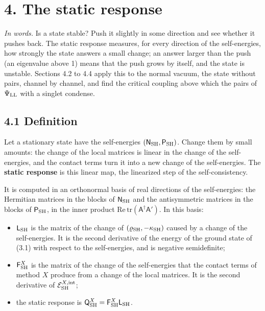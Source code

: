 \documentclass[
  10pt,
]{article}
\providecommand{\tightlist}{%
  \setlength{\itemsep}{0pt}\setlength{\parskip}{0pt}}
\begin{document}
\hypertarget{the-static-response}{%
\section{4. The static response}\label{the-static-response}}

\emph{In words.} Is a state stable? Push it slightly in some direction
and see whether it pushes back. The static response measures, for every
direction of the self-energies, how strongly the state answers a small
change; an answer larger than the push (an eigenvalue above 1) means
that the push grows by itself, and the state is unstable. Sections 4.2
to 4.4 apply this to the normal vacuum, the state without pairs, channel
by channel, and find the critical coupling above which the pairs of
\(\Psi_{\rm LL}\) with a singlet condense.

\hypertarget{definition}{%
\subsection{4.1 Definition}\label{definition}}

Let a stationary state have the self-energies
\((\mathsf N_{\rm SH},\mathsf P_{\rm SH})\). Change them by small
amounts: the change of the local matrices is linear in the change of the
self-energies, and the contact terms turn it into a new change of the
self-energies. The \textbf{static response} is this linear map, the
linearized step of the self-consistency.

It is computed in an orthonormal basis of real directions of the
self-energies: the Hermitian matrices in the blocks of
\(\mathsf N_{\rm SH}\) and the antisymmetric matrices in the blocks of
\(\mathsf P_{\rm SH}\), in the inner product
\(\mathrm{Re}\,\mathrm{tr}(\mathsf A^\dagger\mathsf A')\). In this
basis:

\begin{itemize}
\tightlist
\item
  \(\mathsf L_{\rm SH}\) is the matrix of the change of
  \((\varrho_{\rm SH},-\kappa_{\rm SH})\) caused by a change of the
  self-energies. It is the second derivative of the energy of the ground
  state of (3.1) with respect to the self-energies, and is negative
  semidefinite;
\item
  \(\mathsf F^X_{\rm SH}\) is the matrix of the change of the
  self-energies that the contact terms of method \(X\) produce from a
  change of the local matrices. It is the second derivative of
  \(\mathcal E^{X,{\rm int}}_{\rm SH}\);
\item
  the static response is
  \(\mathsf Q^X_{\rm SH}=\mathsf F^X_{\rm SH}\mathsf L_{\rm SH}\).
\end{itemize}
\end{document}
